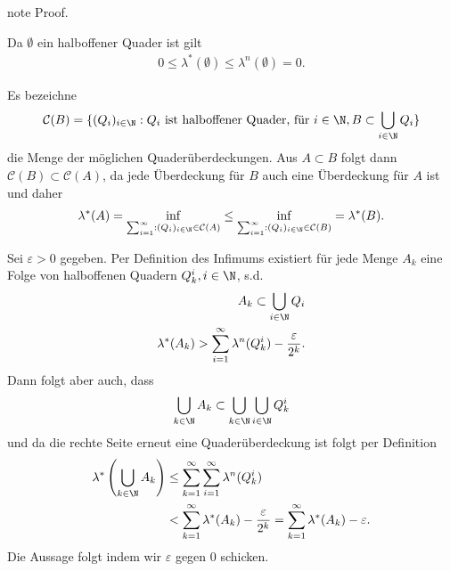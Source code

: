 \documentclass[letterpaper,10pt,english]{jupyterBook}
\begin{document}
\begin{sphinxadmonition}{note}
\sphinxAtStartPar
Proof. 

\sphinxAtStartPar
Da \(\emptyset\) ein halboffener Quader ist gilt
\begin{equation*}
\begin{split}0\leq \lambda^\ast(\emptyset) \leq \lambda^n(\emptyset) = 0.\end{split}
\end{equation*}
\sphinxAtStartPar
{}

\sphinxAtStartPar
Es bezeichne
\begin{equation*}
\begin{split}\mathcal{C}(B) = \{ (Q_i)_{i\in\N}: Q_i \text{ ist halboffener Quader, für }i\in\N, B\subset \bigcup_{i\in\N} Q_i  \}\end{split}
\end{equation*}
\sphinxAtStartPar
die Menge der möglichen Quaderüberdeckungen. Aus \(A\subset B\) folgt dann \(\mathcal{C}(B) \subset \mathcal{C}(A)\), da jede Überdeckung für \(B\) auch eine Überdeckung für \(A\) ist und daher
\begin{equation*}
\begin{split}\lambda^\ast(A) = \inf_{\sum_{i=1}^\infty:(Q_i)_{i\in\N}\in \mathcal{C}(A)} \leq 
\inf_{\sum_{i=1}^\infty:(Q_i)_{i\in\N}\in \mathcal{C}(B)} = \lambda^\ast(B).\end{split}
\end{equation*}
\sphinxAtStartPar
{}

\sphinxAtStartPar
Sei \(\varepsilon>0\) gegeben. Per Definition des Infimums existiert für jede Menge \(A_k\) eine Folge von halboffenen Quadern \(Q_k^i, i\in\N\), s.d.
\begin{equation*}
\begin{split}A_k \subset \bigcup_{i\in\N} Q_i\\
\lambda^\ast(A_k) > \sum_{i=1}^\infty \lambda^n(Q_k^i) - \frac{\varepsilon}{2^k}.\end{split}
\end{equation*}
\sphinxAtStartPar
Dann folgt aber auch, dass
\begin{equation*}
\begin{split}\bigcup_{k\in\N} A_k \subset \bigcup_{k\in\N}\bigcup_{i\in\N} Q_k^i\end{split}
\end{equation*}
\sphinxAtStartPar
und da die rechte Seite erneut eine Quaderüberdeckung ist folgt per Definition
\begin{equation*}
\begin{split}\lambda^\ast\left(\bigcup_{k\in\N} A_k\right) 
&\leq \sum_{k=1}^\infty\sum_{i=1}^\infty \lambda^n(Q_k^i)\\
&<
\sum_{k=1}^\infty \lambda^\ast(A_k) - \frac{\varepsilon}{2^k} =
\sum_{k=1}^\infty \lambda^\ast(A_k) - \varepsilon.\end{split}
\end{equation*}
\sphinxAtStartPar
Die Aussage folgt indem wir \(\varepsilon\) gegen 0 schicken.


\end{sphinxadmonition}
\end{document}
